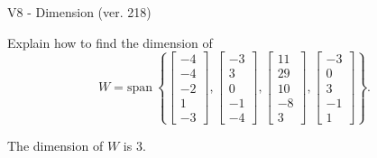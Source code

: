 \begin{exercise}
  \begin{exerciseTitle}V8 - Dimension (ver. 218)\end{exerciseTitle}
  \begin{exerciseStatement}
    Explain how to find the dimension of 
\[W=\mathrm{span}\ \left\{\left[\begin{array}{r}
-4 \\
-4 \\
-2 \\
1 \\
-3
\end{array}\right] , \left[\begin{array}{r}
-3 \\
3 \\
0 \\
-1 \\
-4
\end{array}\right] , \left[\begin{array}{r}
11 \\
29 \\
10 \\
-8 \\
3
\end{array}\right] , \left[\begin{array}{r}
-3 \\
0 \\
3 \\
-1 \\
1
\end{array}\right]\right\}.\]



  \end{exerciseStatement}
  \begin{exerciseAnswer}
   The dimension of \(W\) is  \(3\).
  


  \end{exerciseAnswer}
\end{exercise}